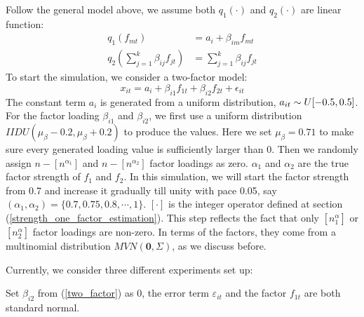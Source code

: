Follow the general model above, we assume both $q_1(\cdot)$ and $q_2(\cdot)$ are linear function:
\begin{align*}
q_1({f_{mt}}) &= a_{i} +\beta_{im} f_{mt}\\
q_2(\sum_{j = 1}^{k}\beta_{ij}f_{jt}) &=\sum_{j = 1}^{k}\beta_{ij}f_{jt}
\end{align*}
To start the simulation, we consider a two-factor model:
\[    x_{it} = a_{i} + \beta_{i1}f_{1t} + \beta_{i2}f_{2t}+\epsilon_{it} \tag{7} \label{two_factor}   \]
The constant term $a_{i}$ is generated from a uniform distribution, $a_{it} \sim \mathnormal{U}[-0.5,0.5]$.
For the factor loading $\beta_{i1}$ and $\beta_{i2}$, we first use a uniform distribution $IIDU(\mu_{\beta} - 0.2, \mu_{\beta}+0.2)$ to produce the values.
Here we set $\mu_{\beta}=0.71$ to make sure every generated loading value is sufficiently larger than 0.
Then we randomly assign $n - [n^{\alpha_{1}}]$ and $n - [n^{\alpha_{2}}]$ factor loadings as zero.
$\alpha_1$ and $\alpha_2$ are the true factor strength of $f_1$ and $f_2$. 
In this simulation, we will start the factor strength from 0.7 and increase it gradually till unity with pace 0.05, say $(\alpha_{1}, \alpha_{2}) = \{0.7, 0.75,0.8,\cdots,1\}$.
 $[\cdot]$ is the integer operator defined at section (\ref{strength_one_factor_estimation}).
This step reflects the fact that only $[n^\alpha_1]$ or $[n^\alpha_2]$ factor loadings are non-zero.
In terms of the factors, they come from a multinomial distribution $MVN(\mathbf{0}, \Sigma) $, as we discuss before.

Currently, we consider three different experiments set up:

\begin{experiment}
Set $\beta_{i2}$ from (\ref{two_factor}) as 0, the error term $\varepsilon_{it}$ and the factor $f_{1t}$ are both standard normal.
\end{experiment}

